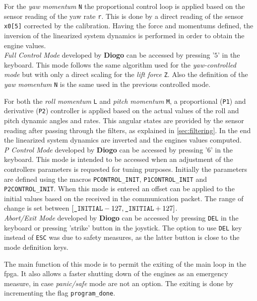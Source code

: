 \documentclass{article}
\begin{document}
For the \textit{yaw momentum} \texttt{N} the proportional control loop is applied based on the sensor reading of the yaw rate \texttt{r}. This is done by a direct reading of the sensor \texttt{x0[5]} corrected by the calibration. Having the force and momentums defined, the inversion of the linearized system dynamics is performed in order to obtain the engine values. \\

\textit{Full Control Mode} developed by \textbf{Diogo} can be accessed by pressing '$5$' in the keyboard. This mode follows the same algorithm used for the \textit{yaw-controlled mode} but with only a direct scaling for the \textit{lift force} \texttt{Z}. Also the definition of the \textit{yaw momentum} \texttt{N} is the same used in the previous controlled mode. 

For both the \textit{roll momentum} \texttt{L} and \textit{pitch momentum} \texttt{M}, a proportional (\texttt{P1}) and derivative (\texttt{P2}) controller is applied based on the actual values of the roll and pitch dynamic angles and rates. This angular states are provided by the sensor reading after passing through the filters, as explained in \ref{sec:filtering}. In the end the linearized system dynamics are inverted and the engines values computed.\\

\textit{P Control Mode} developed by \textbf{Diogo} can be accessed by pressing '$6$' in the keyboard. This mode is intended to be accessed when an adjustment of the controllers parameters is requested for tuning purposes. Initially the parameters are defined using the macros \texttt{PCONTROL\_INIT}, \texttt{P1CONTROL\_INIT} and \texttt{P2CONTROL\_INIT}. When this mode is entered an offset can be applied to the initial values based on the received in the communication packet. The range of change is set between $[\text{\texttt{\_INITIAL}}-127,\text{\texttt{\_INITIAL}}+127]$.\\

\textit{Abort/Exit Mode} developed by \textbf{Diogo} can be accessed by pressing \texttt{DEL} in the keyboard or pressing 'strike' button in the joystick. The option to use \texttt{DEL} key instead of \texttt{ESC} was due to safety measures, as the latter button is close to the mode definition keys. 

The main function of this mode is to permit the exiting of the main loop in the fpga. It also allows a faster shutting down of the engines as an emergency measure, in case \textit{panic/safe} mode are not an option. The exiting is done by incrementing the flag \texttt{program\_done}.
\end{document}
